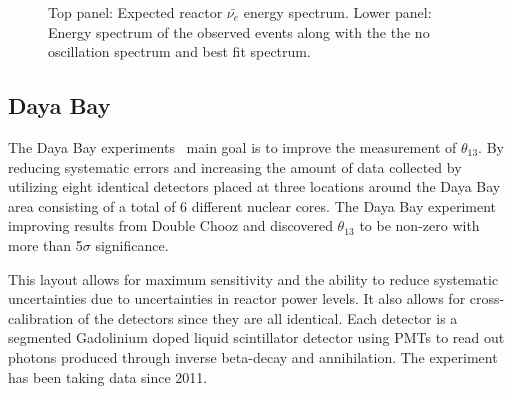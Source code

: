 \begin{figure}[h!]
\begin{minipage}[b]{0.49\textwidth}
       \vspace{2mm}
    \caption{Top panel: Expected reactor $\bar{\nu_e}$ energy spectrum. Lower panel: Energy spectrum of the observed events along with the the no oscillation spectrum and best fit spectrum. }
     \label{fig:KamLAND2}
  \end{minipage}
\end{figure}

\subsection{Daya Bay}

The Daya Bay experiments~\cite{44DayaBay} main goal is to improve the measurement of $\theta_{13}$. By reducing systematic errors and increasing the amount of data collected by utilizing eight identical detectors placed at three locations around the Daya Bay area consisting of a total of 6 different nuclear cores. The Daya Bay experiment  improving results from Double Chooz and discovered $\theta_{13}$ to be non-zero with more than 5$\sigma$ significance.

This layout allows for maximum sensitivity and the ability to reduce systematic uncertainties due to uncertainties in reactor power levels. It also allows for cross-calibration of the detectors since they are all identical. Each detector is a segmented Gadolinium doped liquid scintillator detector using PMTs to read out photons produced through inverse beta-decay and annihilation. The experiment has been taking data since 2011.

